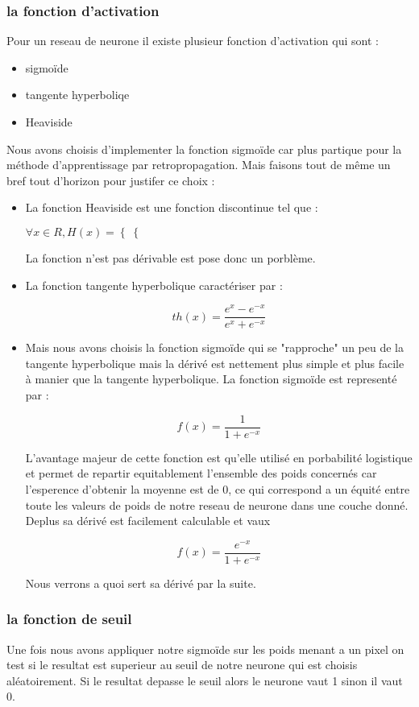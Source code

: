 \subsubsection{la fonction d'activation}
Pour un reseau de neurone il existe plusieur fonction d'activation qui sont :
\begin{itemize}
\item sigmoïde
\item tangente hyperboliqe
\item Heaviside
\end{itemize}
\vspace{0.5cm}
Nous avons choisis d'implementer la fonction sigmoïde car plus partique pour la méthode d'apprentissage par retropropagation.
Mais faisons tout de même un bref tout d'horizon pour justifer ce choix :
\begin{itemize}
\item
La fonction Heaviside est une fonction discontinue tel que :
\begin{center}
$
 \forall x \in R, H(x) =  \left \{
\right \{
 $
\end{center}
La fonction n'est pas dérivable est pose donc un porblème.
\item
La fonction tangente hyperbolique caractériser par :
\begin{center}
\[ th(x) = \frac{e^{x} - e^{-x}}{e^{x} + e^{-x}}\]
\end{center}
\item
Mais nous avons choisis la fonction sigmoïde qui se "rapproche" un peu de la tangente hyperbolique mais la dérivé est nettement plus simple et plus facile à manier que la tangente hyperbolique. La fonction sigmoïde est representé par :
\begin{center}
\[ f(x) = \frac{1}{1 + e^{-x}} \]
\end{center}
L'avantage majeur de cette fonction est qu'elle utilisé en porbabilité logistique et permet de repartir equitablement l'ensemble des poids concernés car l'esperence d'obtenir la moyenne est de 0, ce qui correspond a un équité entre toute les valeurs de poids de notre reseau de neurone dans une couche donné.
Deplus sa dérivé est facilement calculable et vaux
\begin{center}
\[ f(x) = \frac{e^{-x}}{1+e^{-x}} \]
\end{center}
Nous verrons a quoi sert sa dérivé par la suite.
\end{itemize}

\subsubsection{la fonction de seuil}
Une fois nous avons appliquer notre sigmoïde sur les poids menant a un pixel on test si le resultat est superieur au seuil de notre neurone qui est choisis aléatoirement.
Si le resultat depasse le seuil alors le neurone vaut 1 sinon il vaut 0.

